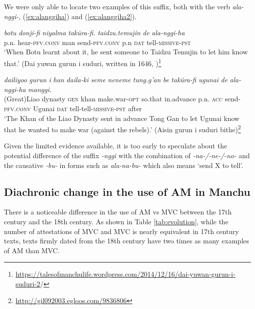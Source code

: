\documentclass{article}
\newcommand{\ipa}[1]{\textit{{\phon\mbox{#1}}}} %
\begin{document}
We were only able to locate two examples of this suffix, both with the verb \ipa{ala-nggi-}, (\ref{ex:alanggiha}) and (\ref{ex:alanggiha2}).

\begin{exe}
\ex \label{ex:alanggiha}
\gll \ipa{botu} 	\ipa{donji-fi} 	\ipa{niyalma} 	\ipa{takūra-fi.} 	\ipa{taidzu.temujin} 	\ipa{de} 	\ipa{ala-nggi-ha} \\
p.n. hear-\textsc{pfv.conv} man send-\textsc{pfv.conv} p.n \textsc{dat} tell-\textsc{missive-pst} \\
\glt `When Botu learnt about it, he sent someone to Taidzu Temujin to let him know that.' (Dai yuwan gurun i suduri, written in 1646, \citealt[121-192]{klaproth1828chrestomathie})\footnote{
 \url{https://talesofmanchulife.wordpress.com/2014/12/16/dai-yuwan-gurun-i-suduri-2}/
}
\end{exe}


\begin{exe}
\ex \label{ex:alanggiha2}
\gll 
\ipa{dailiyoo} 	\ipa{gurun} 	\ipa{i} 	\ipa{han} 	\ipa{daila-ki} 	\ipa{seme} 	\ipa{neneme} 	\ipa{tung.g’an} 	\ipa{be} 	\ipa{takûra-fi} 	\ipa{ugunai} 	\ipa{de} 	\ipa{ala-nggi-ha} 	\ipa{manggi.} \\
(Great)Liao dynasty \textsc{gen} khan make.war-\textsc{opt} so.that in.advance p.n. \textsc{acc} send-\textsc{pfv.conv} Ugunai \textsc{dat} tell-tell-\textsc{missive-pst} after \\
\glt `The Khan of the Liao Dynasty sent in advance Tong Gan to let Ugunai know that he wanted to make war (against the rebels).' (Aisin gurun i suduri bithe)\footnote{\url{http://gil092003.egloos.com/9836806}}
\end{exe}

Given the limited evidence available, it is too early to speculate about the potential difference of the suffix \ipa{-nggi} with the combination of \ipa{-na-/-ne-/-no-} and the causative \ipa{-bu-} in forms such as \ipa{ala-na-bu-} which also means `send X to tell'.
 
\subsection{Diachronic change in the use of AM in Manchu} \label{sec:diachrony}
There is a noticeable difference in the use of AM vs MVC between the 17th century and the 18th century. As shown in Table \ref{tab:evolution}, while the number of attestations of MVC and MVC is nearly equivalent in 17th century texts, texts firmly dated from the 18th century have two times as many examples of AM than MVC. 
\end{document}
